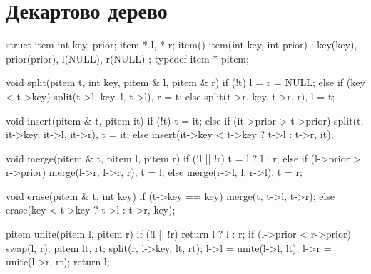 \documentclass[12pt, titlepage]{article}
\begin{document}
\section{Декартово дерево}
\begin{cppcode}
struct item {
    int key, prior;
    item * l, * r;
    item() { }
    item(int key, int prior) : key(key), prior(prior), l(NULL), r(NULL) { }
};
typedef item * pitem;

void split(pitem t, int key, pitem & l, pitem & r) {
    if (!t)
        l = r = NULL;
    else if (key < t->key)
        split(t->l, key, l, t->l),  r = t;
    else
        split(t->r, key, t->r, r),  l = t;
}

void insert(pitem & t, pitem it) {
    if (!t)
        t = it;
    else if (it->prior > t->prior)
        split(t, it->key, it->l, it->r),  t = it;
    else
        insert(it->key < t->key ? t->l : t->r, it);
}

void merge(pitem & t, pitem l, pitem r) {
    if (!l || !r)
        t = l ? l : r;
    else if (l->prior > r->prior)
        merge(l->r, l->r, r),  t = l;
    else
        merge(r->l, l, r->l),  t = r;
}

void erase(pitem & t, int key) {
    if (t->key == key)
        merge(t, t->l, t->r);
    else
        erase(key < t->key ? t->l : t->r, key);
}

pitem unite(pitem l, pitem r) {
    if (!l || !r)  return l ? l : r;
    if (l->prior < r->prior)  swap(l, r);
    pitem lt, rt;
    split(r, l->key, lt, rt);
    l->l = unite(l->l, lt);
    l->r = unite(l->r, rt);
    return l;
}
\end{cppcode}
\end{document}
